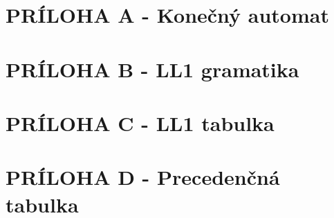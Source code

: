 \documentclass[a4paper, 12pt]{article}
\begin{document}
	\newpage
	\section{PRÍLOHA A - Konečný automat}
	
	\newpage
	\section{PRÍLOHA B - LL1 gramatika}
	
	\newpage
	\section{PRÍLOHA C - LL1 tabulka}
	
	\newpage
	\section{PRÍLOHA D - Precedenčná tabulka}
	
\end{document}
